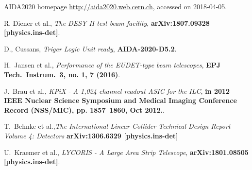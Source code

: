 \documentclass[conference]{IEEEtran}
\begin{document}
%
%
%
\begin{thebibliography}{1}


AIDA2020 homepage \url{http://aida2020.web.cern.ch}, accessed on 2018-04-05.

R. Diener et al., \emph{The DESY II test beam facility},  \textbf{arXiv:1807.09328 [physics.ins-det]}.

D., Cussans, {\em Triger Logic Unit ready}, \textbf{AIDA-2020-D5.2}.

H.~Jansen et al., {\em Performance of the EUDET-type beam telescopes}, \textbf{EPJ Tech.\ Instrum.\  {\bf 3}, no. 1, 7 (2016)}.

J.~Brau et al., {\em KPiX - A 1,024 channel readout ASIC for the ILC}, \textbf{in 2012 IEEE Nuclear Science Symposium and Medical Imaging Conference Record (NSS/MIC), pp. 1857–1860, Oct 2012.}.

T.~Behnke et al.,{\em The International Linear Collider Technical Design Report - Volume 4: Detectors}  \textbf{arXiv:1306.6329 [physics.ins-det]}


U.~Kraemer et al., {\em LYCORIS - A Large Area Strip Telescope}, \textbf{arXiv:1801.08505 [physics.ins-det]}.

\end{thebibliography}




\end{document}
